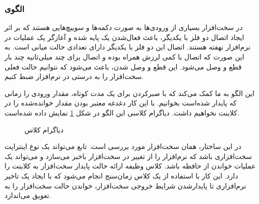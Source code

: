 \subsubsection{الگوی }
\label{HWDebouncingSec}
\begin{RTL}
در سخت‌افزار بسیاری از ورودی‌ها به صورت دکمه‌ها و سوییچ‌هایی هستند که بر اثر ایجاد
اتصال دو فلز با یکدیگر، باعث فعال‌شدن یک پایه شده و آغازگر یک عملیات در نرم‌افزار
نهفته هستند. اتصال این دو فلز با یکدیگر دارای تعدادی حالت میانی است. به این صورت
که اتصال با کمی لرزش همراه بوده و اتصال برای چند میلی‌ثانیه چند بار قطع و وصل
می‌شود. این قطع و وصل شدن، باعث می‌شود که نتوانیم حالت فعلی سخت‌افزار را به درستی
در نرم‌افزار ضبط کنیم.
\end{RTL}
\begin{RTL}
این الگو به ما کمک می‌کند که با صبرکردن برای یک مدت کوتاه، مقدار ورودی را
زمانی که پایدار شده‌است بخوانیم. با این کار دغدغه معتبر بودن مقدار خوانده‌شده را
در کلاینت نخواهیم داشت. دیاگرام کلاسی این الگو در شکل \ref{HWDebouncingClassDiag}
نمایش داده شده‌است.
\end{RTL}
\begin{figure}[h!]
\centering
{}
\caption{دیاگرام کلاس }
\label{HWDebouncingClassDiag}
\end{figure}
\begin{RTL}
در این ساختار،  همان سخت‌افزار مورد بررسی است.
تابع  می‌تواند یک نوع اینتراپت سخت‌افزاری باشد که نرم‌افزار را
از تغییر در سخت‌افزار باخبر می‌سازد و  می‌تواند یک عملیات
خواندن از حافظه باشد.
کلاس  وظیفه ارائه حالت پایدار سخت‌افزار به کلاینت را دارد.
این کار با استفاده از یک کلاس زمان‌سنج انجام می‌شود که با ایجاد یک تاخیر نرم‌افزاری
تا پایدارشدن شرایط خروجی سخت‌افزار، خواندن حالت سخت‌افزار را به تعویق می‌اندازد.
\end{RTL}